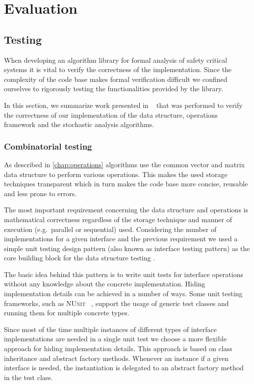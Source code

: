\chapter{Evaluation}
\label{chap:evaluation}

\section{Testing}

When developing an algorithm library for formal analysis of safety
critical systems it is vital to verify the correctness of the
implementation. Since the complexity of the code base makes formal
verification difficult we confined ourselves to rigorously testing the
functionalities provided by the library.

In this section, we summarize work presented in%
~\citep{TDK2015_Klenik_Marussy} that was performed to verify the
correctness of our implementation of the data structure, operations
framework and the stochastic analysis algorithms.

\subsection{Combinatorial testing}

As described in \cref{chap:operations} algorithms use the common
vector and matrix data structure to perform various operations. This
makes the used storage techniques transparent which in turn makes the
code base more concise, reusable and less prone to errors.

The most important requirement concerning the data structure and
operations is mathematical correctness regardless of the storage
technique and manner of execution (e.g.~parallel or sequential)
used. Considering the number of implementations for a given interface
and the previous requirement we used a simple unit testing design
pattern (also known as interface testing pattern) as the core building
block for the data structure testing \citep{myers2011art}.

The basic idea behind this pattern is to write unit tests for
interface operations without any knowledge about the concrete
implementation. Hiding implementation details can be achieved in a
number of ways. Some unit testing frameworks, such as \textsc{NUnit}%
~\citep{NUnit}, support the usage of generic test classes and running
them for multiple concrete types.

Since most of the time multiple instances of different types of
interface implementations are needed in a single unit test we choose a
more flexible approach for hiding implementation details. This
approach is based on class inheritance and abstract factory
methods. Whenever an instance if a given interface is needed, the
instantiation is delegated to an abstract factory method in the test
class.

